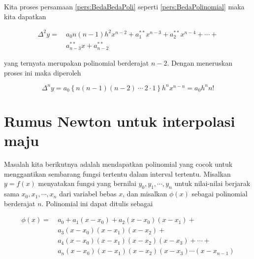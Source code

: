 Kita proses persamaan \ref{pers:BedaBedaPoli} seperti \ref{pers:BedaPolinomial} maka kita dapatkan

\begin{equation}
\begin{split}
\Delta^2y =~& a_0n(n-1)h^2x^{n-2} + a_1^{**}x^{n-3} + a_2^{**}x^{n-4} + \cdots + \\
&a_{n-3}^{**}x + a_{n-2}^{**}
\end{split}
\end{equation}

yang ternyata merupakan polinomial berderajat $n-2$. Dengan meneruskan proses ini maka diperoleh

\begin{equation}
\Delta^ny = a_0\left\{ n(n-1)(n-2) ~\cdots~ 2 \cdot 1 \right\}h^nx^{n-n} = a_0h^nn!
\end{equation}

\section{Rumus Newton untuk interpolasi maju}
Masalah kita berikutnya adalah mendapatkan polinomial yang cocok untuk menggantikan sembarang fungsi tertentu dalam interval tertentu. Misalkan $y = f(x)$ menyatakan fungsi yang bernilai $y_0, y_1, \cdots, y_n$ untuk nilai-nilai berjarak sama $x_0, x_1, \cdots, x_n$ dari variabel bebas $x$, dan misalkan $\phi(x)$ sebagai polinomial berderajat $n$. Polinomial ini dapat ditulis sebagai

\begin{equation}\label{pers:PoliPhi}
\begin{split}
\phi(x) =~&a_0 + a_1(x-x_0) + a_2(x-x_0)(x-x_1) + \\
&a_3(x-x_0)(x-x_1)(x-x_2) + \\
&a_4(x-x_0)(x-x_1)(x-x_2)(x-x_3) + \cdots +\\
&a_n(x-x_0)(x-x_1)(x-x_2)(x-x_3)\cdots(x-x_{n-1})\\
\end{split}
\end{equation}

